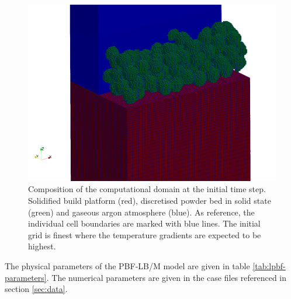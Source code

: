 \documentclass[conference,final,a4paper]{IEEEtran}
\begin{document}
\begin{figure}[!tbp]
  \centering
  \includegraphics[width=\linewidth]{Figs/powderbed.png}
  \caption{Composition of the computational domain at the initial time step. Solidified build platform (red), discretised powder bed in solid state (green) and gaseous argon atmosphere (blue). As reference, the individual cell boundaries are marked with blue lines. The initial grid is finest where the temperature gradients are expected to be highest.}
  \label{fig:lpbf-initial}
\end{figure}


The physical parameters of the PBF-LB/M model are given in table \ref{tab:lpbf-parameters}. The numerical parameters are given in the case files referenced in section \ref{sec:data}.
\end{document}
